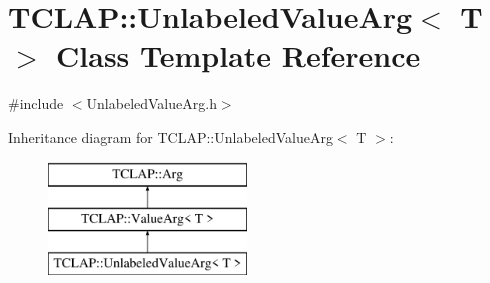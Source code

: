 \hypertarget{class_t_c_l_a_p_1_1_unlabeled_value_arg}{}\section{T\+C\+L\+A\+P\+:\+:Unlabeled\+Value\+Arg$<$ T $>$ Class Template Reference}
\label{class_t_c_l_a_p_1_1_unlabeled_value_arg}


{\ttfamily \#include $<$Unlabeled\+Value\+Arg.\+h$>$}

Inheritance diagram for T\+C\+L\+A\+P\+:\+:Unlabeled\+Value\+Arg$<$ T $>$\+:\begin{figure}[H]
\begin{center}
\leavevmode
\includegraphics[height=3.000000cm]{class_t_c_l_a_p_1_1_unlabeled_value_arg}
\end{center}
\end{figure}
